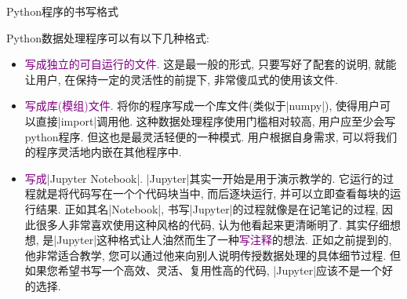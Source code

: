 \documentclass{beamer}
\newcommand{\purple}{\textcolor{purple}}
\begin{document}
    \begin{frame}[fragile]{Python程序的书写格式}
      \begin{block}{}\small
        Python数据处理程序可以有以下几种格式:
        \begin{itemize}\small
          \item \purple{写成独立的可自运行的文件.} 这是最一般的形式, 只要写好了配套的说明, 就能让用户, 在保持一定的灵活性的前提下, 非常傻瓜式的使用该文件. 
          \item \purple{写成库(模组)文件.} 将你的程序写成一个库文件(类似于\cverb|numpy|), 使得用户可以直接\cverb|import|调用他. 这种数据处理程序使用门槛相对较高, 用户应至少会写python程序. 但这也是最灵活轻便的一种模式. 用户根据自身需求, 可以将我们的程序灵活地内嵌在其他程序中.
          \item \purple{写成}\cverb|Jupyter Notebook|\purple{.} \cverb|Jupyter|其实一开始是用于演示教学的. 它运行的过程就是将代码写在一个个代码块当中, 而后逐块运行, 并可以立即查看每块的运行结果. 正如其名\cverb|Notebook|, 书写\cverb|Jupyter|的过程就像是在记笔记的过程, 因此很多人非常喜欢使用这种风格的代码, 认为他看起来更清晰明了. 其实仔细想想, 是\cverb|Jupyter|这种格式让人油然而生了一种\purple{写注释}的想法. 正如之前提到的, 他非常适合教学, 您可以通过他来向别人说明传授数据处理的具体细节过程. 但如果您希望书写一个高效、灵活、复用性高的代码, \cverb|Jupyter|应该不是一个好的选择.
        \end{itemize}
      \end{block}
    \end{frame}
\end{document}
